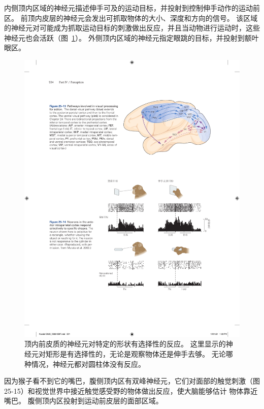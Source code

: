 内侧顶内区域的神经元描述伸手可及的运动目标，并投射到控制伸手动作的运动前区。
前顶内皮层的神经元会发出可抓取物体的大小、深度和方向的信号。
该区域的神经元对可能成为抓取运动目标的刺激做出反应，并且当动物进行运动时，这些神经元也会活跃（图~\ref{fig:25_14}）。
外侧顶内区域的神经元指定眼跳的目标，并投射到额叶眼区。


\begin{figure}[htbp]
	\centering
	\includegraphics[width=0.75\linewidth]{chap25/fig_25_14}
	\caption{顶内前皮质的神经元对特定的形状有选择性的反应。
		这里显示的神经元对矩形是有选择性的，无论是观察物体还是伸手去够。
		无论哪种情况，神经元都对圆柱体没有反应。}
	\label{fig:25_14}
\end{figure}


因为猴子看不到它的嘴巴，腹侧顶内区有双峰神经元，它们对面部的触觉刺激（图 25-15）和视觉世界中接近触觉感受野的物体做出反应，使大脑能够估计 物体靠近嘴巴。
腹侧顶内区投射到运动前皮层的面部区域。


